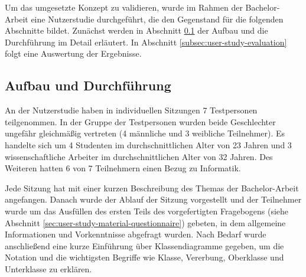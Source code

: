 Um das umgesetzte Konzept zu validieren, wurde im Rahmen der Bachelor-Arbeit eine Nutzerstudie durchgeführt, die den Gegenstand für die folgenden Abschnitte bildet. Zunächst werden in Abschnitt \ref{subsec:user-study-setting} der Aufbau und die Durchführung im Detail erläutert. In Abschnitt \ref{subsec:user-study-evaluation} folgt eine Auswertung der Ergebnisse.

\subsection{Aufbau und Durchführung}
\label{subsec:user-study-setting}

An der Nutzerstudie haben in individuellen Sitzungen 7 Testpersonen teilgenommen. In der Gruppe der Testpersonen wurden beide Geschlechter ungefähr gleichmäßig vertreten (4 männliche und 3 weibliche Teilnehmer). Es handelte sich um 4 Studenten im durchschnittlichen Alter von 23 Jahren und 3 wissenschaftliche Arbeiter im durchschnittlichen Alter von 32 Jahren. Des Weiteren hatten 6 von 7 Teilnehmern einen Bezug zu Informatik.

Jede Sitzung hat mit einer kurzen Beschreibung des Themas der Bachelor-Arbeit angefangen. Danach wurde der Ablauf der Sitzung vorgestellt und der Teilnehmer wurde um das Ausfüllen des ersten Teils des vorgefertigten Fragebogens (siehe Abschnitt \ref{sec:user-study-material-questionnaire}) gebeten, in dem allgemeine Informationen und Vorkenntnisse abgefragt wurden. Nach Bedarf wurde anschließend eine kurze Einführung über Klassendiagramme gegeben, um die Notation und die wichtigsten Begriffe wie Klasse, Vererbung, Oberklasse und Unterklasse zu erklären.










